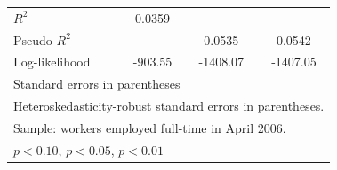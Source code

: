 \begin{table}[htbp]
\begin{tabular}{l*{3}{c}}
$R^2$               &      0.0359         &                     &                     \\
Pseudo $R^2$        &                     &      0.0535         &      0.0542         \\
Log-likelihood      &     -903.55         &    -1408.07         &    -1407.05         \\
\bottomrule
\multicolumn{4}{l}{\footnotesize Standard errors in parentheses}\\
\multicolumn{4}{l}{\footnotesize Heteroskedasticity-robust standard errors in parentheses.}\\
\multicolumn{4}{l}{\footnotesize Sample: workers employed full-time in April 2006.}\\
\multicolumn{4}{l}{\footnotesize \sym{*} \(p<0.10\), \sym{**} \(p<0.05\), \sym{***} \(p<0.01\)}\\
\end{tabular}
\end{table}
